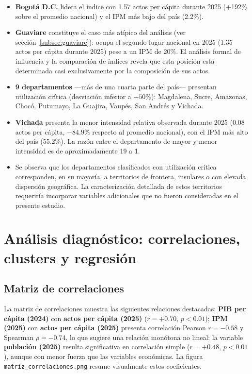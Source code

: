 \documentclass{article}
\begin{document}
\begin{itemize}
    \item \textbf{Bogotá D.C.} lidera el índice con
    1.57 actos per cápita durante 2025 (+192\% sobre
    el promedio nacional) y el IPM más bajo del país (2.2\%).

    \item \textbf{Guaviare} constituye el caso más atípico del análisis
    (ver sección~\ref{subsec:guaviare}): ocupa el segundo lugar
    nacional en 2025 (1.35 actos per cápita durante 2025) pese a un IPM de 20\%.
    El análisis formal de influencia y la comparación de índices
    revela que esta posición está determinada casi exclusivamente
    por la composición de sus actos.

    \item \textbf{9 departamentos} —más de una cuarta 
    parte del país— presentan utilización crítica 
    (desviación inferior a $-50\%$): Magdalena, Sucre, 
    Amazonas, Chocó, Putumayo, La Guajira, Vaupés, 
    San Andrés y Vichada.

    \item \textbf{Vichada} presenta la menor intensidad
    relativa observada durante 2025 (0.08 actos per cápita,
    $-84.9\%$ respecto al promedio nacional), con el IPM
    más alto del país (55.2\%). La razón entre el departamento
    de mayor y menor intensidad es de aproximadamente 19 a 1.

    \item Se observa que los departamentos clasificados con utilización crítica corresponden, en su mayoría, a territorios de frontera, insulares o con elevada dispersión geográfica. La caracterización detallada de estos territorios requeriría incorporar variables adicionales que no fueron consideradas en el presente estudio.
\end{itemize}

\section{Análisis diagnóstico: correlaciones, clusters y regresión}

\subsection{Matriz de correlaciones}

La matriz de correlaciones muestra las siguientes relaciones
destacadas: \textbf{PIB per cápita (2024)} con \textbf{actos per
cápita (2025)} ($r = +0.70$, $p < 0.01$); \textbf{IPM (2025)} con
\textbf{actos per cápita (2025)} presenta correlación Pearson
$r = -0.58$ y Spearman $\rho = -0.74$, lo que sugiere una relación
monótona no lineal; la variable \textbf{población (2025)} resulta
significativa en correlación simple ($r = +0.48$, $p < 0.01$), aunque
con menor fuerza que las variables económicas. La figura
\texttt{matriz\_correlaciones.png} resume visualmente estos
coeficientes.
\end{document}
